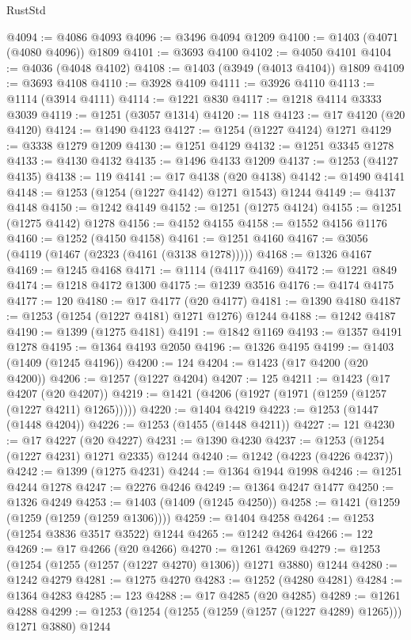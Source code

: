 \begin{lexlean}{RustStd}
\begin{coremodule}
@4094 := @4086 @4093
@4096 := @3496 @4094 @1209
@4100 := @1403 (@4071 (@4080 @4096)) @1809
@4101 := @3693 @4100
@4102 := @4050 @4101
@4104 := @4036 (@4048 @4102)
@4108 := @1403 (@3949 (@4013 @4104)) @1809
@4109 := @3693 @4108
@4110 := @3928 @4109
@4111 := @3926 @4110
@4113 := @1114 (@3914 @4111)
@4114 := @1221 @830
@4117 := @1218 @4114 @3333 @3039
@4119 := @1251 (@3057 @1314)
@4120 := 118
@4123 := @17 @4120 (@20 @4120)
@4124 := @1490 @4123
@4127 := @1254 (@1227 @4124) @1271
@4129 := @3338 @1279 @1209
@4130 := @1251 @4129
@4132 := @1251 @3345 @1278
@4133 := @4130 @4132
@4135 := @1496 @4133 @1209
@4137 := @1253 (@4127 @4135)
@4138 := 119
@4141 := @17 @4138 (@20 @4138)
@4142 := @1490 @4141
@4148 := @1253 (@1254 (@1227 @4142) @1271 @1543) @1244
@4149 := @4137 @4148
@4150 := @1242 @4149
@4152 := @1251 (@1275 @4124)
@4155 := @1251 (@1275 @4142) @1278
@4156 := @4152 @4155
@4158 := @1552 @4156 @1176
@4160 := @1252 (@4150 @4158)
@4161 := @1251 @4160
@4167 := @3056 (@4119 (@1467 (@2323 (@4161 (@3138 @1278)))))
@4168 := @1326 @4167
@4169 := @1245 @4168
@4171 := @1114 (@4117 @4169)
@4172 := @1221 @849
@4174 := @1218 @4172 @1300
@4175 := @1239 @3516
@4176 := @4174 @4175
@4177 := 120
@4180 := @17 @4177 (@20 @4177)
@4181 := @1390 @4180
@4187 := @1253 (@1254 (@1227 @4181) @1271 @1276) @1244
@4188 := @1242 @4187
@4190 := @1399 (@1275 @4181)
@4191 := @1842 @1169
@4193 := @1357 @4191 @1278
@4195 := @1364 @4193 @2050
@4196 := @1326 @4195
@4199 := @1403 (@1409 (@1245 @4196))
@4200 := 124
@4204 := @1423 (@17 @4200 (@20 @4200))
@4206 := @1257 (@1227 @4204)
@4207 := 125
@4211 := @1423 (@17 @4207 (@20 @4207))
@4219 := @1421 (@4206 (@1927 (@1971 (@1259 (@1257 (@1227 @4211) @1265)))))
@4220 := @1404 @4219
@4223 := @1253 (@1447 (@1448 @4204))
@4226 := @1253 (@1455 (@1448 @4211))
@4227 := 121
@4230 := @17 @4227 (@20 @4227)
@4231 := @1390 @4230
@4237 := @1253 (@1254 (@1227 @4231) @1271 @2335) @1244
@4240 := @1242 (@4223 (@4226 @4237))
@4242 := @1399 (@1275 @4231)
@4244 := @1364 @1944 @1998
@4246 := @1251 @4244 @1278
@4247 := @2276 @4246
@4249 := @1364 @4247 @1477
@4250 := @1326 @4249
@4253 := @1403 (@1409 (@1245 @4250))
@4258 := @1421 (@1259 (@1259 (@1259 (@1259 @1306))))
@4259 := @1404 @4258
@4264 := @1253 (@1254 @3836 @3517 @3522) @1244
@4265 := @1242 @4264
@4266 := 122
@4269 := @17 @4266 (@20 @4266)
@4270 := @1261 @4269
@4279 := @1253 (@1254 (@1255 (@1257 (@1227 @4270) @1306)) @1271 @3880) @1244
@4280 := @1242 @4279
@4281 := @1275 @4270
@4283 := @1252 (@4280 @4281)
@4284 := @1364 @4283
@4285 := 123
@4288 := @17 @4285 (@20 @4285)
@4289 := @1261 @4288
@4299 := @1253 (@1254 (@1255 (@1259 (@1257 (@1227 @4289) @1265))) @1271 @3880) @1244

\end{coremodule}
\end{lexlean}

